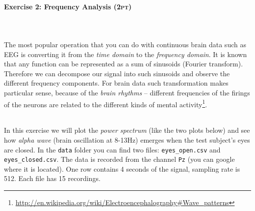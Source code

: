 \documentclass[a4paper,11pt]{article}
\newenvironment{exercise}[3]{\paragraph{Exercise #1: #2 \textsc{(#3pt)}}\ \\}{
\medskip}
\begin{document}
%
%
\begin{exercise}{2}{Frequency Analysis}{2}\\
The most popular operation that you can do with continuous brain data such as EEG is converting it from the \emph{time domain} to the \emph{frequency domain}. It is known that any function can be represented as a sum of sinusoids (Fourier transform). Therefore we can decompose our signal into such sinusoids and observe the different frequency components. For brain data such transformation makes particular sense, because of the \emph{brain rhythms} -- different frequencies of the firings of the neurons are related to the different kinds of mental activity\footnote{\url{http://en.wikipedia.org/wiki/Electroencephalography\#Wave_patterns}}.

\ \\
In this exercise we will plot the \emph{power spectrum} (like the two plots below) and see how \emph{alpha wave} (brain oscillation at 8-13Hz) emerges when the test subject's eyes are closed. In the \texttt{data} folder you can find two files: \texttt{eyes\_open.csv} and \texttt{eyes\_closed.csv}. The data is recorded from the channel \texttt{Pz} (you can google where it is located). One row contains 4 seconds of the signal, sampling rate is 512. Each file has 15 recordings.


\end{exercise}
\end{document}
